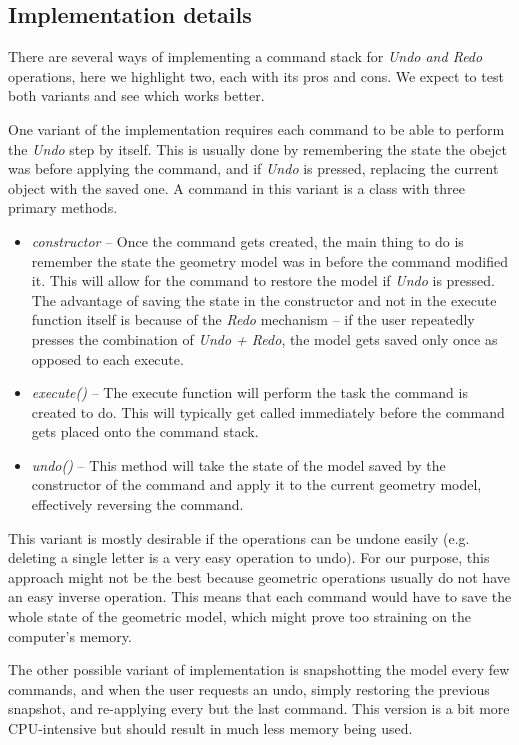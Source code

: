 \subsection*{Implementation details}

There are several ways of implementing a command stack for \textit{Undo and Redo} operations, here we highlight two, each with its pros and cons. We expect to test both variants and see which works better.

One variant of the implementation requires each command to be able to perform the \textit{Undo} step by itself. This is usually done by remembering the state the obejct was before applying the command, and if \textit{Undo} is pressed, replacing the current object with the saved one. A command in this variant is a class with three primary methods.
\begin{itemize}
\item \textit{constructor} -- Once the command gets created, the main thing to do is remember the state the geometry model was in before the command modified it. This will allow for the command to restore the model if \textit{Undo} is pressed. The advantage of saving the state in the constructor and not in the execute function itself is because of the \textit{Redo} mechanism -- if the user repeatedly presses the combination of \textit{Undo + Redo}, the model gets saved only once as opposed to each execute.
\item \textit{execute()} -- The execute function will perform the task the command is created to do. This will typically get called immediately before the command gets placed onto the command stack.
\item \textit{undo()} -- This method will take the state of the model saved by the constructor of the command and apply it to the current geometry model, effectively reversing the command.
\end{itemize}

This variant is mostly desirable if the operations can be undone easily (e.g. deleting a single letter is a very easy operation to undo). For our purpose, this approach might not be the best because geometric operations usually do not have an easy inverse operation. This means that each command would have to save the whole state of the geometric model, which might prove too straining on the computer's memory.

The other possible variant of implementation is snapshotting the model every few commands, and when the user requests an undo, simply restoring the previous snapshot, and re-applying every but the last command. This version is a bit more CPU-intensive but should result in much less memory being used.

